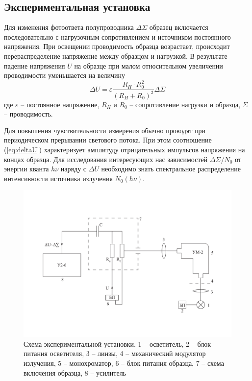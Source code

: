 \documentclass[a4paper, 12pt]{article}
\begin{document}
\subsection{Экспериментальная установка}
    Для изменения фотоответа полупроводника $\Delta\Sigma$ образец включается последовательно с нагрузочным сопротивлением и источником постоянного напряжения. При освещении проводимость образца возрастает, происходит перераспределение напряжение между образцом и нагрузкой. В результате падение напряжения $U$ на образце при малом относительном увеличении проводимости уменьшается на величину
    \begin{equation}
        \Delta U=\varepsilon\frac{R_H\cdot R_0^2}{(R_H+R_0)^2}\Delta\Sigma
        \label{eq:deltaU}
    \end{equation}
    где $\varepsilon$ -- постоянное напряжение, $R_H$ и $R_0$ -- сопротивление нагрузки и образца, $\Sigma$ -- проводимость.

    Для повышения чувствительности измерения обычно проводят при периодическом прерывании светового потока. При этом соотношение (\ref{eq:deltaU}) характеризует амплитуду отрицательных импульсов напряжения на концах образца. Для исследования интересующих нас зависимостей $\Delta\Sigma/N_0$ от энергии кванта $h\nu$ наряду с $\Delta U$ необходимо знать спектральное распределение интенсивности источника излучения $N_0(h\nu)$.
    \begin{figure}[!htb]
        \centering
        \includegraphics[width=\textwidth]{img/exp_scheme.pdf}
        \caption{Схема экспериментальной установки. 1 -- осветитель, 2 -- блок питания осветителя, 3 -- линзы, 4 -- механический модулятор излучения, 5 -- монохроматор, 6 -- блок питания образца, 7 -- схема включения образца, 8 -- усилитель}
    \end{figure}
\end{document}
